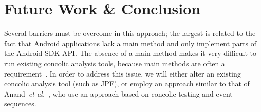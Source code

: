 \documentclass{sig-alternate}
\newcommand{\sam}[1]{\textcolor{red}{{\it [Sam says: #1]}}}
\newcommand{\dan}[1]{\textcolor{blue}{{\it [Dan says: #1]}}}
\begin{document}
\section{Future Work \& Conclusion}
\label{sec: conclusion}



%


Several barriers must be overcome in this approach; the largest is related to the fact that Android applications lack a main method and only implement parts of the Android SDK API. The absence of a main method makes it very difficult to run existing concolic analysis tools, because main methods are often a requirement~\cite{Anand:2012:ACT:2393596.2393666}. In order to address this issue, we will either alter an existing concolic analysis tool (such as JPF), or employ an approach similar to that of Anand~\emph{et al.}~\cite{Anand:2012:ACT:2393596.2393666}, who use an approach based on concolic testing and event sequences.








\end{document}
